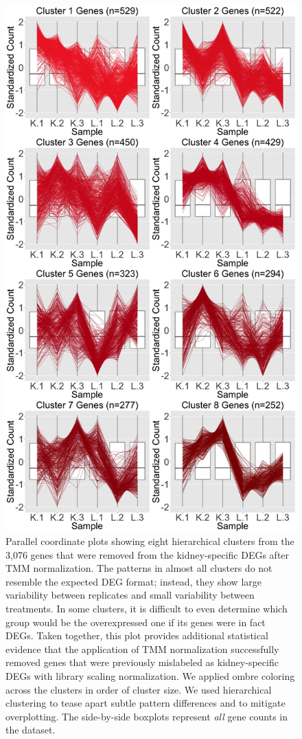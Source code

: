 \documentclass{article}
\begin{document}
  \null
  \begin{figure}[t!]
  \centerline{\includegraphics[width=0.65\columnwidth]{../MakeFigures/lkClustersRemove.jpg}}
  \caption{Parallel coordinate plots showing eight hierarchical clusters from the 3,076 genes that were removed from the kidney-specific DEGs after TMM normalization. The patterns in almost all clusters do not resemble the expected DEG format; instead, they show large variability between replicates and small variability between treatments. In some clusters, it is difficult to even determine which group would be the overexpressed one if its genes were in fact DEGs. Taken together, this plot provides additional statistical evidence that the application of TMM normalization successfully removed genes that were previously mislabeled as kidney-specific DEGs with library scaling normalization. We applied ombre coloring across the clusters in order of cluster size. We used hierarchical clustering to tease apart subtle pattern differences and to mitigate overplotting. The side-by-side boxplots represent \textit{all} gene counts in the dataset.
  \label{lkClustersRemove}}
  \end{figure}
  
\end{document}
